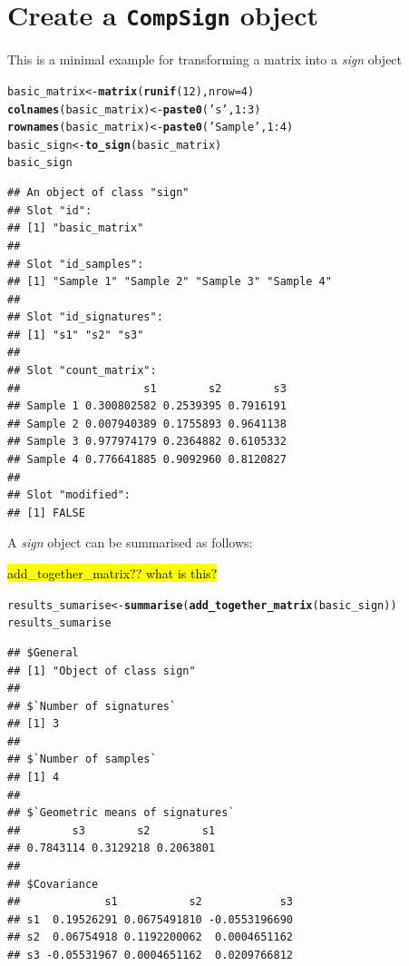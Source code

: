 \documentclass{article}\usepackage[]{graphicx}\usepackage[]{color}
\makeatletter
\newcommand{\hlnum}[1]{\textcolor[rgb]{0.686,0.059,0.569}{#1}}%
\newcommand{\hlstr}[1]{\textcolor[rgb]{0.192,0.494,0.8}{#1}}%
\newcommand{\hlopt}[1]{\textcolor[rgb]{0,0,0}{#1}}%
\newcommand{\hlstd}[1]{\textcolor[rgb]{0.345,0.345,0.345}{#1}}%
\newcommand{\hlkwb}[1]{\textcolor[rgb]{0.69,0.353,0.396}{#1}}%
\newcommand{\hlkwc}[1]{\textcolor[rgb]{0.333,0.667,0.333}{#1}}%
\newcommand{\hlkwd}[1]{\textcolor[rgb]{0.737,0.353,0.396}{\textbf{#1}}}%
\newenvironment{kframe}{%
 \def\at@end@of@kframe{}%
 \ifinner\ifhmode%
  \def\at@end@of@kframe{\end{minipage}}%
  \begin{minipage}{\columnwidth}%
 \fi\fi%
 \def\FrameCommand##1{\hskip\@totalleftmargin \hskip-\fboxsep
 \colorbox{shadecolor}{##1}\hskip-\fboxsep
     \hskip-\linewidth \hskip-\@totalleftmargin \hskip\columnwidth}%
 \MakeFramed {\advance\hsize-\width
   \@totalleftmargin\z@ \linewidth\hsize
   \@setminipage}}%
 {\par\unskip\endMakeFramed%
 \at@end@of@kframe}
\newenvironment{knitrout}{}{} %
\makeatother
\begin{document}
\section{Create a \texttt{CompSign} object}
This is a minimal example for transforming a matrix into a \emph{sign} object
\begin{knitrout}
\color{fgcolor}\begin{kframe}
\begin{alltt}
\hlstd{basic_matrix} \hlkwb{<-} \hlkwd{matrix}\hlstd{(}\hlkwd{runif}\hlstd{(}\hlnum{12}\hlstd{),} \hlkwc{nrow} \hlstd{=} \hlnum{4}\hlstd{)}
\hlkwd{colnames}\hlstd{(basic_matrix)} \hlkwb{<-} \hlkwd{paste0}\hlstd{(}\hlstr{'s'}\hlstd{,} \hlnum{1}\hlopt{:}\hlnum{3}\hlstd{)}
\hlkwd{rownames}\hlstd{(basic_matrix)} \hlkwb{<-} \hlkwd{paste0}\hlstd{(}\hlstr{'Sample '}\hlstd{,} \hlnum{1}\hlopt{:}\hlnum{4}\hlstd{)}
\hlstd{basic_sign} \hlkwb{<-} \hlkwd{to_sign}\hlstd{(basic_matrix)}
\hlstd{basic_sign}
\end{alltt}
\begin{verbatim}
## An object of class "sign"
## Slot "id":
## [1] "basic_matrix"
## 
## Slot "id_samples":
## [1] "Sample 1" "Sample 2" "Sample 3" "Sample 4"
## 
## Slot "id_signatures":
## [1] "s1" "s2" "s3"
## 
## Slot "count_matrix":
##                   s1        s2        s3
## Sample 1 0.300802582 0.2539395 0.7916191
## Sample 2 0.007940389 0.1755893 0.9641138
## Sample 3 0.977974179 0.2364882 0.6105332
## Sample 4 0.776641885 0.9092960 0.8120827
## 
## Slot "modified":
## [1] FALSE
\end{verbatim}
\end{kframe}
\end{knitrout}

A \emph{sign} object can be summarised as follows:

\hl{add\_together\_matrix?? what is this?}

\begin{knitrout}
\color{fgcolor}\begin{kframe}
\begin{alltt}
\hlstd{results_sumarise} \hlkwb{<-} \hlkwd{summarise}\hlstd{(}\hlkwd{add_together_matrix}\hlstd{(basic_sign))}
\hlstd{results_sumarise}
\end{alltt}
\begin{verbatim}
## $General
## [1] "Object of class sign"
## 
## $`Number of signatures`
## [1] 3
## 
## $`Number of samples`
## [1] 4
## 
## $`Geometric means of signatures`
##        s3        s2        s1 
## 0.7843114 0.3129218 0.2063801 
## 
## $Covariance
##             s1           s2            s3
## s1  0.19526291 0.0675491810 -0.0553196690
## s2  0.06754918 0.1192200062  0.0004651162
## s3 -0.05531967 0.0004651162  0.0209766812
\end{verbatim}
\end{kframe}
\end{knitrout}
\end{document}
